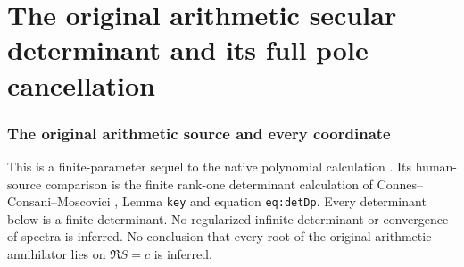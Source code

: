 \documentclass[11pt]{article}
\begin{document}
\endgroup

\clearpage\begingroup
\part*{The original arithmetic secular determinant and its full pole cancellation}
\newcommand{\sfsecC}{\mathbb C}\newcommand{\sfsecR}{\mathbb R}
\newcommand{\sfsecPP}{\mathcal P}\newcommand{\sfsecId}{\operatorname{Id}}
\newcommand{\sfsectr}{\operatorname{tr}}\newcommand{\sfsecim}{\operatorname{im}}
\newcommand{\sfsecord}{\operatorname{ord}}
\newtheorem{sfsectheorem}{Theorem}[section]
\newtheorem{sfsecproposition}[sfsectheorem]{Proposition}
\newtheorem{sfseclemma}[sfsectheorem]{Lemma}


\section{The original arithmetic source and every coordinate}

This is a finite-parameter sequel to the native polynomial calculation
\cite{sfsec:Native}. Its human-source comparison is the finite rank-one
determinant calculation of Connes--Consani--Moscovici \cite{sfsec:CCM},
Lemma \texttt{key} and equation \texttt{eq:detDp}.
Every determinant below is a finite determinant. No regularized
infinite determinant or convergence of spectra is inferred.
No conclusion that every root of the original arithmetic
annihilator lies on $\Re S=c$ is inferred.
\end{document}
